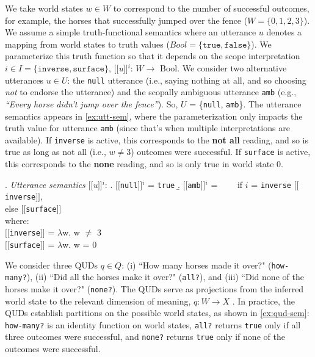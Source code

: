 \documentclass[10pt,a4paper]{article}
\newcommand{\sem}[1]{\mbox{$[\![$#1$]\!]$}}
\begin{document}
We take world states $w\in W$ 
to correspond to the number of successful outcomes, for example, the horses that successfully jumped over the fence ($W=\{0,1,2,3\}$). We assume a simple truth-functional semantics where an utterance $u$ denotes a mapping from world states to truth values ($Bool = \{\texttt{true},\texttt{false}\}$). We parameterize this truth function so that it depends on the scope interpretation $i \in I = \{\texttt{inverse}, \texttt{surface}\}$,
\sem{\textit{u}}$^{i}$: $W\rightarrow$ Bool. 
We consider two alternative utterances $u \in U$: the \texttt{null} utterance (i.e., saying nothing at all, and so choosing \emph{not} to endorse the utterance) and the scopally ambiguous utterance \texttt{amb} (e.g., \textit{``Every horse didn't jump over the fence''}). So, $U$ = \{\texttt{null}, \texttt{amb}\}.  
The utterance semantics appears in \ref{ex:utt-sem},
where the parameterization only impacts the truth value for utterance \texttt{amb} (since that's when multiple interpretations are available). 
If \texttt{inverse} is active, this corresponds to the  \textbf{not all} reading, and so is true as long as not all (i.e., $w$$\neq$3) outcomes were successful.
If  \texttt{surface} is active, this corresponds to the \textbf{none} reading, and so is only true in world state 0.


\ex. \label{ex:utt-sem} \emph{Utterance semantics} \sem{\textit{u}}$^{i}$:
\a. \sem{\texttt{null}}$^{i}$ = \texttt{true}
\b. \sem{\texttt{amb}}$^{i}$ = \ \ \ \ if $i$ = \texttt{inverse}  \sem{\texttt{inverse}}, \\
 else \sem{\texttt{surface}}\\
 where:\\
\sem{\texttt{inverse}} = $\lambda$w. w $\neq$ 3 \\
\sem{\texttt{surface}} = $\lambda$w. w = 0


We consider three QUDs $q \in Q$: 
(i) ``How many horses made it over?" (\texttt{how-many?}), 
(ii) ``Did all the horses make it over?" (\texttt{all?}), and 
(iii) ``Did none of the horses make it over?" (\texttt{none?}). 
The QUDs serve as projections from the inferred world state to the relevant dimension of meaning, $q: W \rightarrow X$ . 
In practice, the QUDs establish partitions on the possible world states, as shown in \ref{ex:qud-sem}: 
\texttt{how-many?} is an identity function on world states, 
\texttt{all?} returns \texttt{true} only if  all three outcomes were successful, and 
\texttt{none?} returns \texttt{true} only if none of the outcomes were successful.
\end{document}
